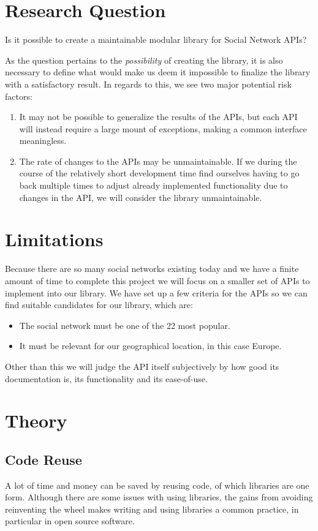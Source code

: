 \documentclass{sigchi-alternate}
\begin{document}
\section{Research Question}
Is it possible to create a maintainable modular library for Social Network APIs?

As the question pertains to the \textit{possibility} of creating the library, it is also necessary to define what would make us deem it impossible to finalize
the library with a satisfactory result. In regards to this, we see two major potential risk factors:
\begin{enumerate}
	\item It may not be possible to generalize the results of the APIs, but each API will instead require a large mount of exceptions, making a common interface meaningless.
	\item The rate of changes to the APIs may be unmaintainable. If we during the course of the relatively short development time find ourselves having to go back multiple
	times to adjust already implemented functionality due to changes in the API, we will consider the library unmaintainable.
\end{enumerate}
\section{Limitations}
Because there are so many social networks existing today and we have a finite amount of time to complete this
project we will focus on a smaller set of APIs to implement into our library.  We have set up a few criteria 
for the APIs so we can find suitable candidates for our library, which are:
\begin{itemize}
	\item The social network must be one of the 22 most popular\autocite{STATISTA_LEADING_SOCIAL_NETWORKS}.
	\item It must be relevant for our geographical location, in this case Europe.
\end{itemize}
Other than this we will judge the API itself subjectively by how good its documentation is, its functionality and its ease-of-use. 

\section{Theory}
\subsection{Code Reuse}
A lot of time and money can be saved by reusing code, of which libraries are one form. Although there are
some issues with using libraries, the gains from avoiding reinventing the wheel makes writing and using
libraries a common practice, in particular in open source software\autocite{2998479020080101}.
\end{document}
